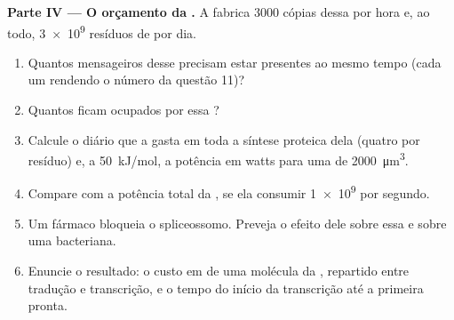 \begin{problem}
\medskip
\noindent\textbf{Parte IV --- O orçamento da .}
A  fabrica \num{3000} cópias dessa  por hora e, ao todo,
\num{3e9} resíduos de  por dia.
\begin{enumerate}[resume]
  \item Quantos mensageiros desse  precisam estar presentes ao mesmo
        tempo (cada um rendendo o número da questão 11)?
  \item Quantos  ficam ocupados por essa ?
  \item Calcule o  diário que a  gasta em toda a síntese
        proteica dela (quatro por resíduo) e, a \qty{50}{kJ/mol}, a
        potência em watts para uma  de \qty{2000}{\micro m^3}.
  \item Compare com a potência total da , se ela consumir
        \qty{1e9}{}  por segundo.
  \item Um fármaco bloqueia o spliceossomo. Preveja o efeito dele sobre
        essa  e sobre uma  bacteriana.
  \item Enuncie o resultado: o custo em  de uma molécula da ,
        repartido entre tradução e transcrição, e o tempo do início da
        transcrição até a primeira  pronta.
\end{enumerate}
\end{problem}
